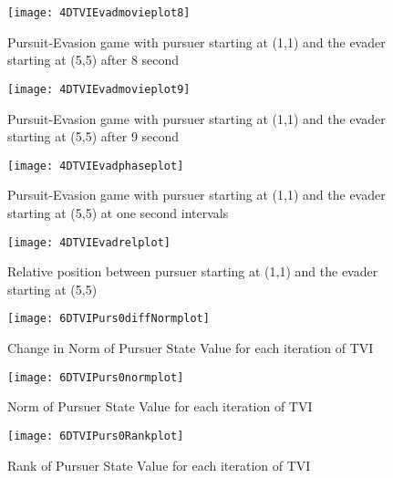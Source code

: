 \begin{figure}
\vspace{2.4in}
\centering
\texttt{[image: 4DTVIEvadmovieplot8]}
\caption{Pursuit-Evasion game with pursuer starting at (1,1) and the evader starting at (5,5) after 8 second}
\label{4DTVIEvadmovieplot8}
\end{figure}
\clearpage
\newpage

\begin{figure}
\vspace{2.4in}
\centering
\texttt{[image: 4DTVIEvadmovieplot9]}
\caption{Pursuit-Evasion game with pursuer starting at (1,1) and the evader starting at (5,5) after 9 second}
\label{4DTVIEvadmovieplot9}
\end{figure}
\clearpage
\newpage

\begin{figure}
\vspace{2.4in}
\centering
\texttt{[image: 4DTVIEvadphaseplot]}
\caption{Pursuit-Evasion game with pursuer starting at (1,1) and the evader starting at (5,5) at one second intervals}
\label{4DTVIEvadphaseplot}
\end{figure}
\clearpage
\newpage

\begin{figure}
\vspace{2.4in}
\centering
\texttt{[image: 4DTVIEvadrelplot]}
\caption{Relative position between pursuer starting at (1,1) and the evader starting at (5,5)}
\label{4DTVIEvadrelplot}
\end{figure}
\clearpage
\newpage

\begin{figure}
\vspace{2.4in}
\centering
\texttt{[image: 6DTVIPurs0diffNormplot]}
\caption{Change in Norm of Pursuer State Value for each iteration of TVI}
\label{6DTVIPurs0diffNormplot}
\end{figure}
\clearpage
\newpage

\begin{figure}
\vspace{2.4in}
\centering
\texttt{[image: 6DTVIPurs0normplot]}
\caption{Norm of Pursuer State Value for each iteration of TVI}
\label{6DTVIPurs0normplot}
\end{figure}
\clearpage
\newpage

\begin{figure}
\vspace{2.4in}
\centering
\texttt{[image: 6DTVIPurs0Rankplot]}
\caption{Rank of Pursuer State Value for each iteration of TVI}
\label{6DTVIPurs0Rankplot}
\end{figure}
\clearpage
\newpage

